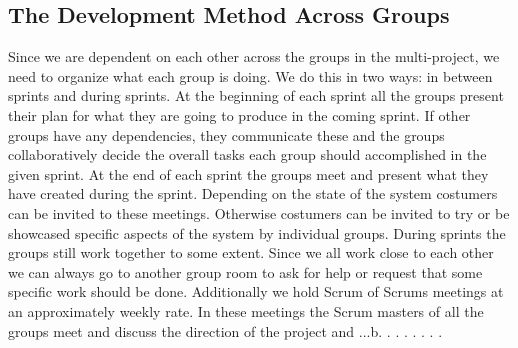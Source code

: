 \subsection{The Development Method Across Groups} %
Since we are dependent on each other across the groups in the multi-project, we need to organize what each group is doing.
We do this in two ways: in between sprints and during sprints.
At the beginning of each sprint all the groups present their plan for what they are going to produce in the coming sprint.
If other groups have any dependencies, they communicate these and the groups collaboratively decide the overall tasks each group should accomplished in the given sprint.
At the end of each sprint the groups meet and present what they have created during the sprint.
Depending on the state of the system costumers can be invited to these meetings.
Otherwise costumers can be invited to try or be showcased specific aspects of the system by individual groups.
During sprints the groups still work together to some extent.
Since we all work close to each other we can always go to another group room to ask for help or request that some specific work should be done.
Additionally we hold Scrum of Scrums meetings at an approximately weekly rate.
In these meetings the Scrum masters of all the groups meet and discuss the direction of the project and ...b. . . . . . .  .